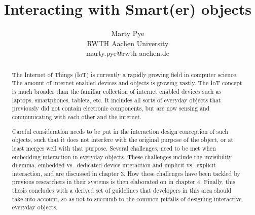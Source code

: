 \documentclass{acm_proc_article-sp}
\begin{document}
\title{Interacting with Smart(er) objects}

\author{Marty Pye\\ RWTH Aachen University\\ marty.pye@rwth-aachen.de}

\maketitle
\begin{abstract}
The Internet of Things (IoT) is currently a rapidly growing field in computer science.
The amount of internet enabled devices and objects is growing vastly. 
The IoT concept is much broader than the familiar collection of internet enabled devices such as laptops, smartphones, tablets, etc.
It includes all sorts of everyday objects that previously did not contain electronic components, but are now sensing and communicating with each other and the internet.

Careful consideration needs to be put in the interaction design conception of such objects, such that it does not interfere with the original purpose of the object, or at least merges well with that purpose.
Several challenges, need to be met when embedding interaction in everyday objects.
These challenges include the invisibility dilemma, embedded vs.\ dedicated device interaction and implicit vs.\ explicit interaction, and are discussed in chapter 3.
How these challenges have been tackled by previous researchers in their systems is then elaborated on in chapter 4. Finally, this thesis concludes with a derived set of guidelines that developers in this area should take into account, so as not to succumb to the common pitfalls of designing interactive everyday objects.
\end{abstract}
\end{document}
